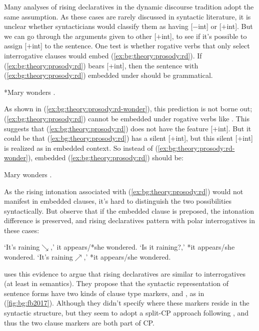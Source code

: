 Many analyses of rising declaratives in the dynamic discourse tradition adopt the same assumption. As these cases are rarely discussed in syntactic literature, it is unclear whether syntacticians would classify them as having [$-$int] or [$+$int]. But we can go through the arguments given to other [$+$int], to see if it's possible to assign [$+$int] to the sentence. One test is whether rogative verbs that only select interrogative clauses would embed (\ref{ex:bg:theory:prosody:rd}). If (\ref{ex:bg:theory:prosody:rd}) bears [+int], then the sentence with (\ref{ex:bg:theory:prosody:rd}) embedded under  should be grammatical.

*Mary wonders .
\eex

As shown in (\ref{ex:bg:theory:prosody:rd-wonder}), this prediction is not borne out; (\ref{ex:bg:theory:prosody:rd}) cannot be embedded under rogative verbs like . This suggests that (\ref{ex:bg:theory:prosody:rd}) does not have the feature [+int]. But it could be that (\ref{ex:bg:theory:prosody:rd}) has a silent [+int], but this silent [+int] is realized as  in embedded context. So instead of (\ref{ex:bg:theory:prosody:rd-wonder}), embedded (\ref{ex:bg:theory:prosody:rd}) should be:

Mary wonders .
\eex

As the rising intonation associated with (\ref{ex:bg:theory:prosody:rd}) would not manifest in embedded clauses, it's hard to distinguish the two possibilities syntactically. But \textcite{farkasroelofsen2017} observe that if the embedded clause is preposed, the intonation difference is preserved, and rising declaratives pattern with polar interrogatives in these cases:

\bxl{}
`It's raining$\searrow$,' it appears/*she wondered.
\ex`Is it raining?,' *it appears/she wondered.
\ex`It's raining$\nearrow$,' *it appears/she wondered.
\exl
\eex

\textcite{farkasroelofsen2017} uses this evidence to argue that rising declaratives are similar to interrogatives (at least in semantics). They propose that the syntactic representation of sentence forms have two kinds of clause type markers,  and , as in (\ref{fig:bg:fb2017}). Although they didn't specify where these markers reside in the syntactic structure, but they seem to adopt a split-CP approach following \textcite{rizzi1997}, and thus the two clause markers are both part of CP. 



